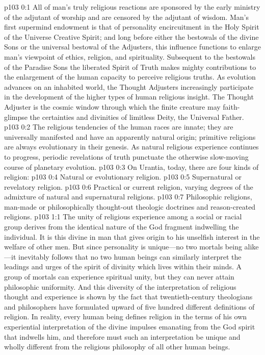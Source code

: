 \author{Melchizedek}
\vs p103 0:1 All of man’s truly religious reactions are sponsored by the early ministry of the adjutant of worship and are censored by the adjutant of wisdom. Man’s first supermind endowment is that of personality encircuitment in the Holy Spirit of the Universe Creative Spirit; and long before either the bestowals of the divine Sons or the universal bestowal of the Adjusters, this influence functions to enlarge man’s viewpoint of ethics, religion, and spirituality. Subsequent to the bestowals of the Paradise Sons the liberated Spirit of Truth makes mighty contributions to the enlargement of the human capacity to perceive religious truths. As evolution advances on an inhabited world, the Thought Adjusters increasingly participate in the development of the higher types of human religious insight. The Thought Adjuster is the cosmic window through which the finite creature may faith\hyp{}glimpse the certainties and divinities of limitless Deity, the Universal Father.
\vs p103 0:2 The religious tendencies of the human races are innate; they are universally manifested and have an apparently natural origin; primitive religions are always evolutionary in their genesis. As natural religious experience continues to progress, periodic revelations of truth punctuate the otherwise slow\hyp{}moving course of planetary evolution.
\pc \vs p103 0:3 On Urantia, today, there are four kinds of religion:
\pc \vs p103 0:4 \bibnobreakspace Natural or evolutionary religion.
\vs p103 0:5 \bibnobreakspace Supernatural or revelatory religion.\plusone
\vs p103 0:6 \bibnobreakspace Practical or current religion, varying degrees of the admixture of natural and supernatural religions.
\vs p103 0:7 \bibnobreakspace Philosophic religions, man\hyp{}made or philosophically thought\hyp{}out theologic doctrines and reason\hyp{}created religions.
\vs p103 1:1 The unity of religious experience among a social or racial group derives from the identical nature of the God fragment indwelling the individual. It is this divine in man that gives origin to his unselfish interest in the welfare of other men. But since personality is unique---no two mortals being alike---it inevitably follows that no two human beings can similarly interpret the leadings and urges of the spirit of divinity which lives within their minds. A group of mortals can experience spiritual unity, but they can never attain philosophic uniformity. And this diversity of the interpretation of religious thought and experience is shown by the fact that twentieth\hyp{}century theologians and philosophers have formulated upward of five hundred different definitions of religion. In reality, every human being defines religion in the terms of his own experiential interpretation of the divine impulses emanating from the God spirit that indwells him, and therefore must such an interpretation be unique and wholly different from the religious philosophy of all other human beings.

